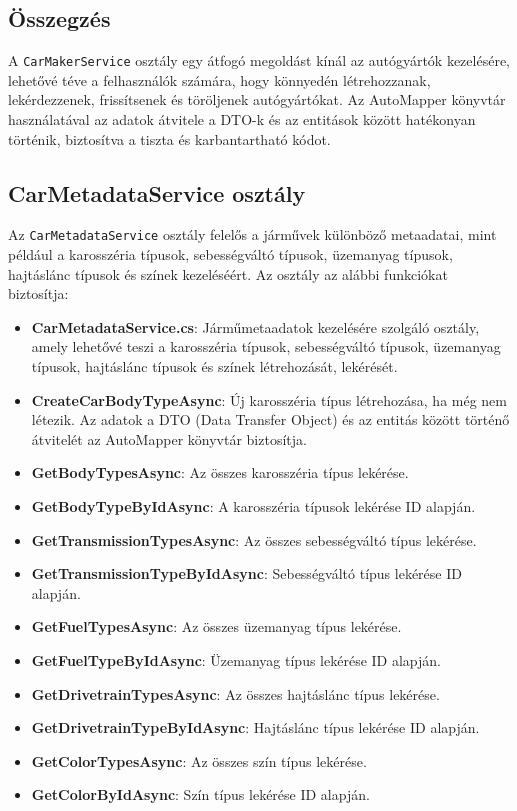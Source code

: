 \documentclass{report}[11pt]
\begin{document}
\subsection*{Összegzés}
A \texttt{CarMakerService} osztály egy átfogó megoldást kínál az autógyártók kezelésére, lehetővé téve a felhasználók számára, hogy könnyedén létrehozzanak, lekérdezzenek, frissítsenek és töröljenek autógyártókat. Az AutoMapper könyvtár használatával az adatok átvitele a DTO-k és az entitások között hatékonyan történik, biztosítva a tiszta és karbantartható kódot.



\subsection{CarMetadataService osztály}

Az \texttt{CarMetadataService} osztály felelős a járművek különböző metaadatai, mint például a karosszéria típusok, sebességváltó típusok, üzemanyag típusok, hajtáslánc típusok és színek kezeléséért. Az osztály az alábbi funkciókat biztosítja:

\begin{itemize}
    \item \textbf{CarMetadataService.cs}: Járműmetaadatok kezelésére szolgáló osztály, amely lehetővé teszi a karosszéria típusok, sebességváltó típusok, üzemanyag típusok, hajtáslánc típusok és színek létrehozását, lekérését.
    \item \textbf{CreateCarBodyTypeAsync}: Új karosszéria típus létrehozása, ha még nem létezik. Az adatok a DTO (Data Transfer Object) és az entitás között történő átvitelét az AutoMapper könyvtár biztosítja.
    \item \textbf{GetBodyTypesAsync}: Az összes karosszéria típus lekérése.
    \item \textbf{GetBodyTypeByIdAsync}: A karosszéria típusok lekérése ID alapján.
    \item \textbf{GetTransmissionTypesAsync}: Az összes sebességváltó típus lekérése.
    \item \textbf{GetTransmissionTypeByIdAsync}: Sebességváltó típus lekérése ID alapján.
    \item \textbf{GetFuelTypesAsync}: Az összes üzemanyag típus lekérése.
    \item \textbf{GetFuelTypeByIdAsync}: Üzemanyag típus lekérése ID alapján.
    \item \textbf{GetDrivetrainTypesAsync}: Az összes hajtáslánc típus lekérése.
    \item \textbf{GetDrivetrainTypeByIdAsync}: Hajtáslánc típus lekérése ID alapján.
    \item \textbf{GetColorTypesAsync}: Az összes szín típus lekérése.
    \item \textbf{GetColorByIdAsync}: Szín típus lekérése ID alapján.
\end{itemize}
\end{document}
